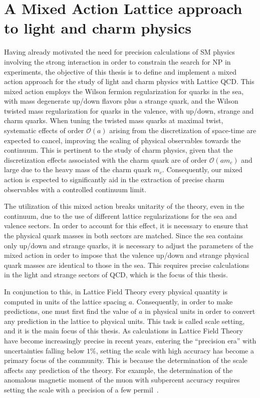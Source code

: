 \section*{A Mixed Action Lattice approach to light and charm physics}

Having already motivated the need for precision calculations of SM physics involving the strong interaction in order to constrain the search for NP in experiments, the objective of this thesis is to define and implement a mixed action approach for the study of light and charm physics with Lattice QCD. This mixed action employs the Wilson fermion regularization for quarks in the sea, with mass degenerate up/down flavors plus a strange quark, and the Wilson twisted mass regularization for quarks in the valence, with up/down, strange and charm quarks. When tuning the twisted mass quarks at maximal twist, systematic effects of order $\mathcal{O}(a)$ arising from the discretization of space-time are expected to cancel, improving the scaling of physical observables towards the continuum. This is pertinent to the study of charm physics, given that the discretization effects associated with the charm quark are of order $\mathcal{O}(am_c)$ and large due to the heavy mass of the charm quark $m_c$. Consequently, our mixed action is expected to significantly aid in the extraction of precise charm observables with a controlled continuum limit.

The utilization of this mixed action breaks unitarity of the theory, even in the continuum, due to the use of different lattice regularizations for the sea and valence sectors. In order to account for this effect, it is necessary to ensure that the physical quark masses in both sectors are matched. Since the sea contains only up/down and strange quarks, it is necessary to adjust the parameters of the mixed action in order to impose that the valence up/down and strange physical quark masses are identical to those in the sea. This requires precise calculations in the light and strange sectors of QCD, which is the focus of this thesis.

In conjunction to this, in Lattice Field Theory every physical quantity is computed in units of the lattice spacing $a$. Consequently, in order to make predictions, one must first find the value of $a$ in physical units in order to convert any prediction in the lattice to physical units. This task is called scale setting, and it is the main focus of this thesis. As calculations in Lattice Field Theory have become increasingly precise in recent years, entering the ``precision era'' with uncertainties falling below $1\%$, setting the scale with high accuracy has become a primary focus of the community. This is because the determination of the scale affects any prediction of the theory. For example, the determination of the anomalous magnetic moment of the muon with subpercent accuracy requires setting the scale with a precision of a few permil~\citep{Borsanyi:2020mff}.

